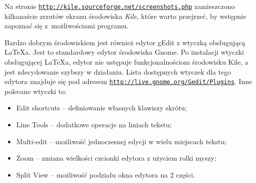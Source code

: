 Na stronie \underline{\texttt{http://kile.sourceforge.net/screenshots.php}} zamieszczono kilkanaście zrzutów ekranu środowiska {\em Kile}, które warto przejrzeć, by wstępnie zapoznać się z~możliwościami programu.

Bardzo dobrym środowiskiem jest również edytor gEdit z wtyczką obsługującą \LaTeX a. Jest to standardowy edytor środowiska Gnome. Po instalacji wtyczki obsługującej \LaTeX a, edytor nie ustępuje funkcjonalnościom środowisku Kile, a jest zdecydowanie szybszy w działaniu. Lista dostępnych wtyczek dla tego edytora znajduje się pod adresem \underline{\texttt{http://live.gnome.org/Gedit/Plugins}}. Inne polecane wtyczki to: 
\begin{itemize}
\item Edit shortcuts -- definiowanie własnych klawiszy skrótu;
\item Line Tools -- dodatkowe operacje na liniach tekstu;
\item Multi-edit -- możliwość jednoczesnej edycji w wielu miejscach tekstu;
\item Zoom -- zmiana wielkości czcionki edytora z użyciem rolki myszy;
\item Split View -- możliwość podziału okna edytora na 2 części. 
\end{itemize}



